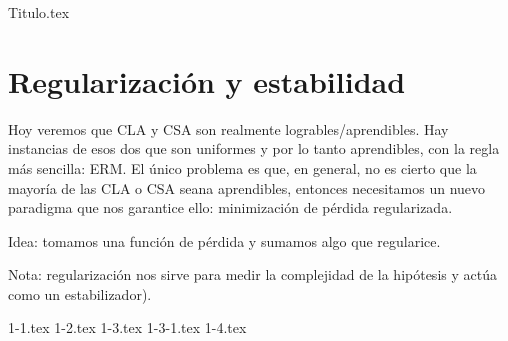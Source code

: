 \documentclass[a4paper,11pt,oneside]{book}
\begin{document}
\frontmatter
{Titulo.tex}

\clearpage
\thispagestyle{empty}

\tableofcontents

\mainmatter
\chapter{Regularización y estabilidad}
Hoy veremos que CLA y CSA son realmente logrables/aprendibles. Hay instancias de esos dos que son uniformes y por lo tanto aprendibles, con la regla más sencilla: ERM.
El único problema es que, en general, no es cierto que la mayoría de las CLA o CSA seana aprendibles, entonces necesitamos un nuevo paradigma que nos garantice ello: minimización de pérdida regularizada.

Idea: tomamos una función de pérdida y sumamos algo que regularice.

Nota: regularización nos sirve para medir la complejidad de la hipótesis y actúa como un estabilizador).

{1-1.tex}
{1-2.tex}
{1-3.tex}
{1-3-1.tex}
{1-4.tex}
\end{document}
